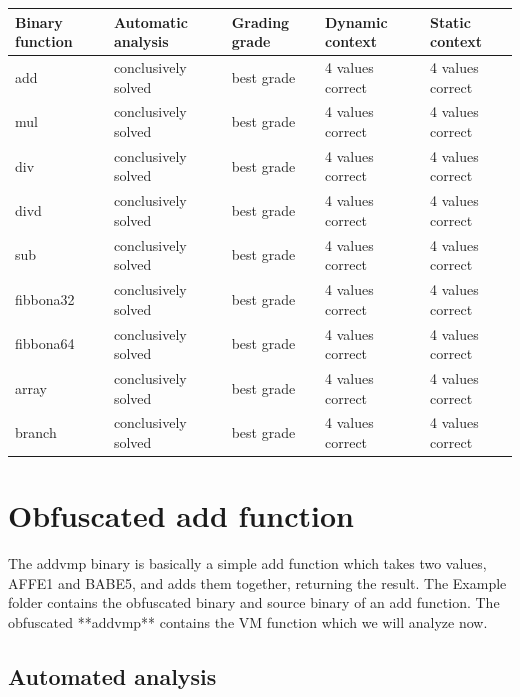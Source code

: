 \documentclass[10pt,twoside,a4paper,bibliography=totoc]{scrbook}
\begin{document}
\begin{center}
\begin{tabular}{l|l|l|l|l}
	\hline
	Binary function & Automatic analysis & Grading grade & Dynamic context & Static context\\
	\hline
	add & conclusively solved & best grade & 4 values correct & 4 values correct\\
	mul & conclusively solved & best grade & 4 values correct & 4 values correct\\
	div & conclusively solved & best grade & 4 values correct & 4 values correct\\
	divd & conclusively solved & best grade & 4 values correct & 4 values correct\\
	sub & conclusively solved & best grade & 4 values correct & 4 values correct\\
	fibbona32 & conclusively solved & best grade & 4 values correct & 4 values correct\\
	fibbona64 & conclusively solved & best grade & 4 values correct & 4 values correct\\
	array & conclusively solved & best grade & 4 values correct & 4 values correct\\
	branch & conclusively solved & best grade & 4 values correct & 4 values correct\\
	\hline
\end{tabular}
\end{center}



\section{Obfuscated add function}
The addvmp binary is basically a simple add function which takes two values, AFFE1 and BABE5, and adds them together, returning the result.
The Example folder contains the obfuscated binary and source binary of an add function. The obfuscated **addvmp** contains the VM function which we will analyze now.

\subsection{Automated analysis}
\end{document}
